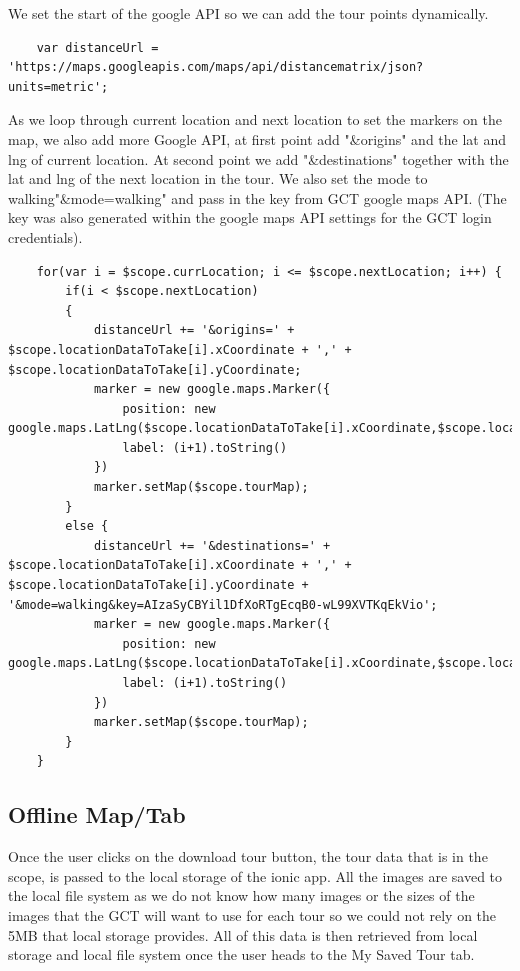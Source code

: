 		We set the start of the google API so we can add the tour points dynamically.\\
\begin{verbatim}
	var distanceUrl = 'https://maps.googleapis.com/maps/api/distancematrix/json?units=metric';
\end{verbatim}

		As we loop through current location and next location to set the markers on the map, we also add more Google API, at first point add "\&origins" and the lat and lng of current location. At second point we add "\&destinations" together with the lat and lng of the next location in the tour. We also set the mode to walking"\&mode=walking" and pass in the key from GCT google maps API. (The key was also generated within the google maps API settings for the GCT login credentials).
		
\begin{verbatim}
	for(var i = $scope.currLocation; i <= $scope.nextLocation; i++) {
		if(i < $scope.nextLocation)
		{
			distanceUrl += '&origins=' + $scope.locationDataToTake[i].xCoordinate + ',' + $scope.locationDataToTake[i].yCoordinate;
			marker = new google.maps.Marker({
				position: new google.maps.LatLng($scope.locationDataToTake[i].xCoordinate,$scope.locationDataToTake[i].yCoordinate),
				label: (i+1).toString()
			})
			marker.setMap($scope.tourMap);
		}
		else {
			distanceUrl += '&destinations=' + $scope.locationDataToTake[i].xCoordinate + ',' + $scope.locationDataToTake[i].yCoordinate + '&mode=walking&key=AIzaSyCBYil1DfXoRTgEcqB0-wL99XVTKqEkVio';
			marker = new google.maps.Marker({
				position: new google.maps.LatLng($scope.locationDataToTake[i].xCoordinate,$scope.locationDataToTake[i].yCoordinate),
				label: (i+1).toString()
			})
			marker.setMap($scope.tourMap);
		}
	}
\end{verbatim}
		
		\subsection{Offline Map/Tab}
		
		
		Once the user clicks on the download tour button, the tour data that is in the scope, is passed to the local storage of the ionic app. All the images are saved to the local file system as we do not know how many images or the sizes of the images that the GCT will want to use for each tour so we could not rely on the 5MB that local storage provides. All of this data is then retrieved from local storage and local file system once the user heads to the My Saved Tour tab. 
		

